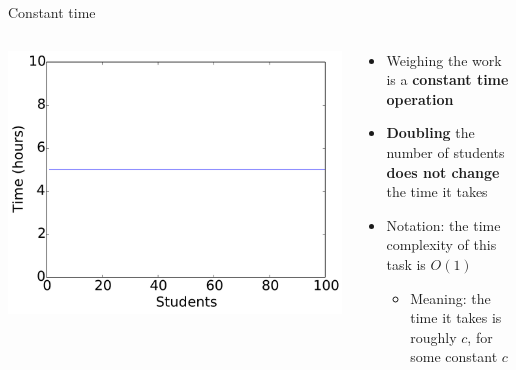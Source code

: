 \begin{frame}{Constant time}
	\begin{columns}
		\begin{column}{0.47\textwidth}
			\includegraphics[width=\textwidth]{plot_constant}
		\end{column}
		\begin{column}{0.47\textwidth}
			\begin{itemize}
				\item Weighing the work is a \textbf{constant time operation} \pause
				\item \textbf{Doubling} the number of students \textbf{does not change} the time it takes \pause
				\item Notation: the time complexity of this task is $O(1)$ \pause
				\begin{itemize}
					\item Meaning: the time it takes is roughly $c$, for some constant $c$
				\end{itemize}
			\end{itemize}
		\end{column}
	\end{columns}
\end{frame}


